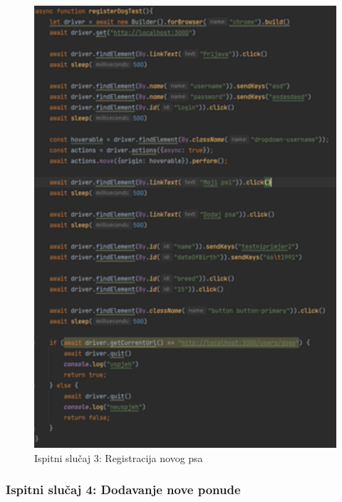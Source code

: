 	 		\begin{figure}[H]
	 			\centering
	 			\includegraphics[width=12cm]{slike/registracijaPsa}
	 			\caption{Ispitni slučaj 3: Registracija novog psa}
	 			\label{fig:Ispitni-slucaj-3}
	 		\end{figure}
 		
 			\subsubsection{Ispitni slučaj 4: Dodavanje nove ponude}
 			
